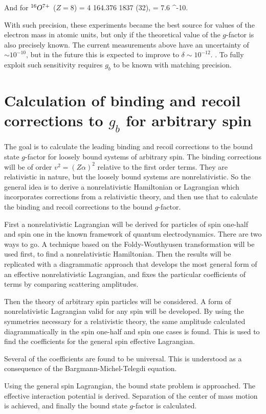 And for $^{16}O^{7+}$ ($Z=8$)
\beq
		  = \num{4 164.376 1837 (32)}, \hspace{3em} \delta= 7.6 ^{-10}.
\eeq

With such precision, these experiments became the best source for values of the electron mass in atomic units, but only if the theoretical value of the $g$-factor is also precisely known.  The current measurements above have an uncertainty of $ \sim 10^{-10}$, but in the future this is expected to improve to $\delta \sim 10^{-12}$. \cite{Jentschura2006102,Quint:2008}.  To fully exploit such sensitivity requires $g_b$ to be known with matching precision.  



\section{Calculation of binding and recoil corrections to $g_b$ for arbitrary spin}
The goal is to calculate the leading binding and recoil corrections to the bound state $g$-factor for loosely bound systems of arbitrary spin.  The binding corrections will be of order $v^2=(Z\alpha)^2$ relative to the first order terms. They are relativistic in nature, but the loosely bound systems are nonrelativistic.  So the general idea is to derive a nonrelativistic Hamiltonian or Lagrangian which incorporates corrections from a relativistic theory, and then use that to calculate the binding and recoil corrections to the bound $g$-factor.

First a nonrelativistic Lagrangian will be derived for particles of spin one-half and spin one in the known framework of quantum electrodynamics.  There are two ways to go.  A technique based on the Foldy-Wouthyusen transformation will be used first, to find a nonrelativistic Hamiltonian.  Then the results will be replicated with a diagrammatic approach that develops the most general form of an effective nonrelativistic Lagrangian, and fixes the particular coefficients of terms by comparing scattering amplitudes.

Then the theory of arbitrary spin particles will be considered.  A form of nonrelativistic Lagrangian valid for any spin will be developed.  By using the symmetries necessary for a relativistic theory, the same amplitude calculated diagrammatically in the spin one-half and spin one cases is found.  This is used to find the coefficients for the general spin effective Lagrangian.

Several of the coefficients are found to be universal.  This is understood as a consequence of the Bargmann-Michel-Telegdi equation.

Using the general spin Lagrangian, the bound state problem is approached.  The effective interaction potential is derived.  Separation of the center of mass motion is achieved, and finally the bound state $g$-factor is calculated.




